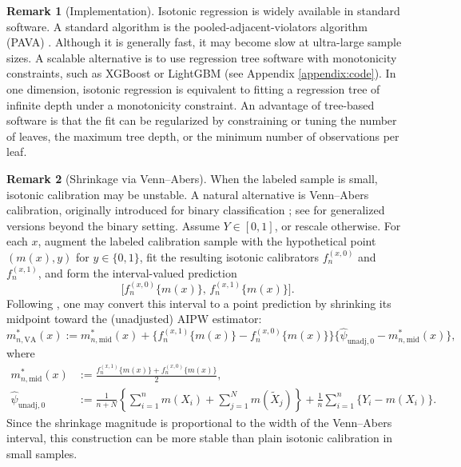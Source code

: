 \documentclass{article}
\theoremstyle{plain}
\theoremstyle{definition}
\newtheorem{remark}{Remark}
\newcommand{\1}{\mathbbm{1}}
\newcommand{\mhat}{m}
\begin{document}
\begin{remark}[Implementation]
Isotonic regression is widely available in standard software. A standard algorithm is the pooled-adjacent-violators algorithm (PAVA) \citep{barlow1972isotonic}. Although it is generally fast, it may become slow at ultra-large sample sizes. A scalable alternative is to use regression tree software with monotonicity constraints, such as XGBoost or LightGBM (see Appendix \ref{appendix:code}). In one dimension, isotonic regression is equivalent to fitting a regression tree of infinite depth under a monotonicity constraint. An advantage of tree-based software is that the fit can be regularized by constraining or tuning the number of leaves, the maximum tree depth, or the minimum number of observations per leaf. 
\end{remark}


\begin{remark}[Shrinkage via Venn--Abers]
When the labeled sample is small, isotonic calibration may be unstable. A natural alternative is Venn--Abers calibration, originally introduced for binary classification \citep{vovk2012venn}; see \cite{van2024self, van2025venn} for generalized versions beyond the binary setting. Assume \(Y \in [0,1]\), or rescale otherwise. For each \(x\), augment the labeled calibration sample with the hypothetical point \((\mhat(x),y)\) for \(y \in \{0,1\}\), fit the resulting isotonic calibrators \(f_n^{(x,0)}\) and \(f_n^{(x,1)}\), and form the interval-valued prediction
\[
\bigl[f_n^{(x,0)}\{\mhat(x)\},\, f_n^{(x,1)}\{\mhat(x)\}\bigr].
\]
Following \cite{vovk2012venn}, one may convert this interval to a point prediction by shrinking its midpoint toward the (unadjusted) AIPW estimator:
\[
m_{n,\mathrm{VA}}^*(x)
:=
m_{n,\mathrm{mid}}^*(x)
+
\bigl\{f_n^{(x,1)}\{\mhat(x)\}-f_n^{(x,0)}\{\mhat(x)\}\bigr\}
\bigl\{\widehat\psi_{\mathrm{unadj},0}-m_{n,\mathrm{mid}}^*(x)\bigr\},
\]
where
\[
\begin{aligned}
m_{n,\mathrm{mid}}^*(x)
&:=
\frac{f_n^{(x,1)}\{\mhat(x)\}+f_n^{(x,0)}\{\mhat(x)\}}{2},\\
\widehat\psi_{\mathrm{unadj},0}
&:=
\frac{1}{n+N}
\left\{
\sum_{i=1}^n \mhat(X_i)
+
\sum_{j=1}^N \mhat(\widetilde X_j)
\right\}
+
\frac{1}{n}\sum_{i=1}^n \{Y_i-\mhat(X_i)\}.
\end{aligned}
\]
Since the shrinkage magnitude is proportional to the width of the Venn--Abers interval, this construction can be more stable than plain isotonic calibration in small samples.
\end{remark}
 
\end{document}
